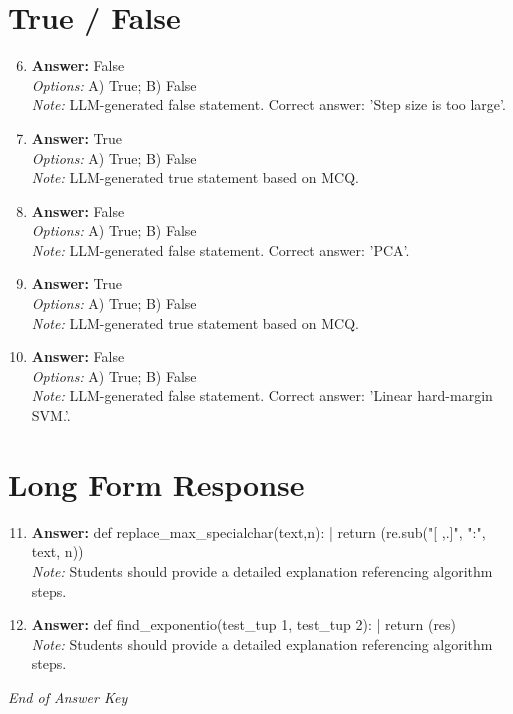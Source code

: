 \documentclass[12pt]{article}
\begin{document}
\section*{True / False}
\begin{enumerate}[label=\arabic*.]
\setcounter{enumi}{5}
\item \textbf{Answer:} False
\\ \textit{Options:} A) True; B) False
\\ \textit{Note:} LLM-generated false statement. Correct answer: 'Step size is too large'.
\item \textbf{Answer:} True
\\ \textit{Options:} A) True; B) False
\\ \textit{Note:} LLM-generated true statement based on MCQ.
\item \textbf{Answer:} False
\\ \textit{Options:} A) True; B) False
\\ \textit{Note:} LLM-generated false statement. Correct answer: 'PCA'.
\item \textbf{Answer:} True
\\ \textit{Options:} A) True; B) False
\\ \textit{Note:} LLM-generated true statement based on MCQ.
\item \textbf{Answer:} False
\\ \textit{Options:} A) True; B) False
\\ \textit{Note:} LLM-generated false statement. Correct answer: 'Linear hard-margin SVM.'.
\end{enumerate}

\section*{Long Form Response}
\begin{enumerate}[label=\arabic*.]
\setcounter{enumi}{10}
\item \textbf{Answer:} def replace\_max\_specialchar(text,n): | return (re.sub("[ ,.]", ":", text, n))
\\ \textit{Note:} Students should provide a detailed explanation referencing algorithm steps.
\item \textbf{Answer:} def find\_exponentio(test\_tup 1, test\_tup 2): | return (res)
\\ \textit{Note:} Students should provide a detailed explanation referencing algorithm steps.
\end{enumerate}

\vfill
\noindent\textit{End of Answer Key}
\end{document}
